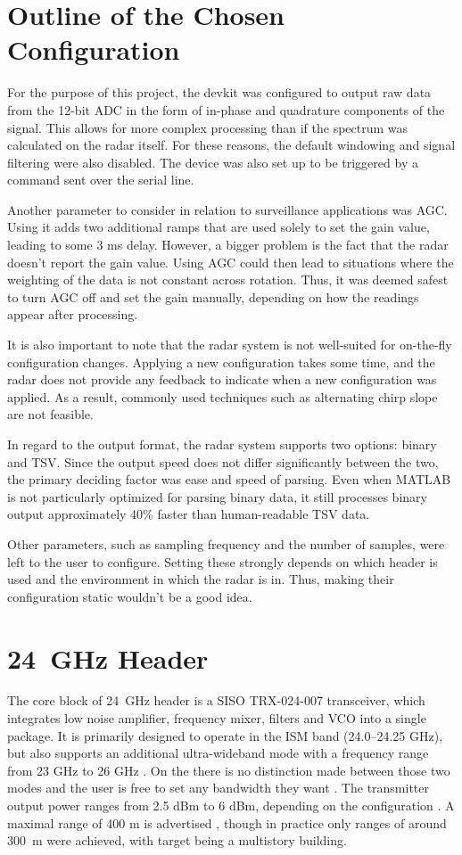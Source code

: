 \section{Outline of the Chosen Configuration }

For the purpose of this project, the devkit was configured to output raw data from the 12-bit ADC in the form of in-phase and quadrature components of the signal.
This allows for more complex processing than if the spectrum was calculated on the radar itself.
For these reasons, the default windowing and signal filtering were also disabled.
The device was also set up to be triggered by a command sent over the serial line.

Another parameter to consider in relation to surveillance applications was AGC.
Using it adds two additional ramps that are used solely to set the gain value, leading to some 3 ms delay.
However, a bigger problem is the fact that the radar doesn't report the gain value.
Using AGC could then lead to situations where the weighting of the data is not constant across rotation.
Thus, it was deemed safest to turn AGC off and set the gain manually, depending on how the readings appear after processing.

It is also important to note that the radar system is not well-suited for on-the-fly configuration changes.
Applying a new configuration takes some time, and the radar does not provide any feedback to indicate when a new configuration was applied.
As a result, commonly used techniques such as alternating chirp slope are not feasible.

In regard to the output format, the radar system supports two options: binary and TSV.
Since the output speed does not differ significantly between the two, the primary deciding factor was ease and speed of parsing.
Even when MATLAB is not particularly optimized for parsing binary data, it still processes binary output approximately 40\% faster than human-readable TSV data.

Other parameters, such as sampling frequency and the number of samples, were left to the user to configure.
Setting these strongly depends on which header is used and the environment in which the radar is in.
Thus, making their configuration static wouldn't be a good idea.


\section{24~GHz Header}

The core block of 24~GHz header is a SISO TRX-024-007 transceiver, which integrates low noise amplifier, frequency mixer, filters and VCO into a single package.
It is primarily designed to operate in the ISM band (24.0--24.25 GHz), but also supports an additional ultra-wideband mode with a frequency range from 23 GHz to 26 GHz \cite{sidarTRX24}.
On the \sidar there is no distinction made between  those two modes and the user is free to set any bandwidth they want \cite{sidarPRO}.
The transmitter output power ranges from 2.5 dBm to 6 dBm, depending on the configuration \cite{sidarTRX24}.
A maximal range of 400 m is advertised \cite{sidarMANOld}, though in practice only ranges of around 300~m were achieved, with target being a multistory building.

